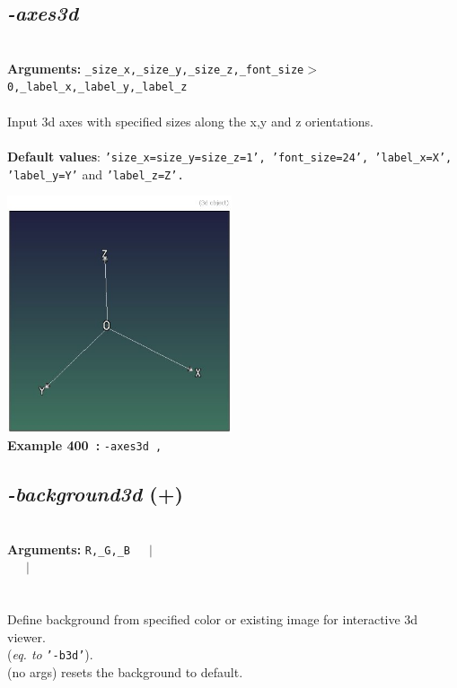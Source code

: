 \documentclass[a4paper,11pt,twoside]{book}
\begin{document}
\subsection{\emph{-axes3d} }\vspace*{-0.5em}
~\\\textbf{Arguments: } 
{\small \texttt{\_size\_x,\_size\_y,\_size\_z,\_font\_size$>$0,\_label\_x,\_label\_y,\_label\_z}}\\~\\
Input 3d axes with specified sizes along the x,y and z orientations.
~\\~\\\textbf{Default values}: {\small \texttt{'size\_x=size\_y=size\_z=1', 'font\_size=24', 'label\_x=X', 'label\_y=Y'} and \texttt{'label\_z=Z'.}}
\begin{center}\includegraphics[keepaspectratio=true,height=7cm,width=\textwidth]{img/gmic_def400.jpg}\\
{\footnotesize \textbf{Example 400~:} \texttt{-axes3d ,}}
\end{center}

\subsection{\emph{-background3d} (+)}\vspace*{-0.5em}
~\\\textbf{Arguments: } 
{\small \texttt{R,\_G,\_B}}~~~$|$\\
\hspace*{2.2cm}{\small \texttt{[image]}}~~~$|$\\
\\~\\
Define background from specified color or existing image for interactive 3d viewer.
~\\(\emph{eq. to} {\small \texttt{'-b3d'}}).
~\\(no args) resets the background to default.
\end{document}
